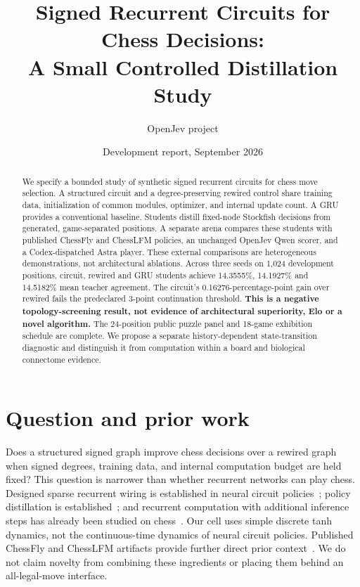 \documentclass[10pt]{article}
\title{Signed Recurrent Circuits for Chess Decisions:\\A Small Controlled Distillation Study}
\author{OpenJev project}
\date{Development report, September 2026}
\begin{document}
\maketitle

\begin{abstract}
We specify a bounded study of synthetic signed recurrent circuits for chess move
selection. A structured circuit and a degree-preserving rewired control share
training data, initialization of common modules, optimizer, and internal update
count. A GRU provides a conventional baseline. Students distill fixed-node
Stockfish decisions from generated, game-separated positions. A separate arena
compares these students with published ChessFly and ChessLFM policies, an
unchanged OpenJev Qwen scorer, and a Codex-dispatched Astra player. These external
comparisons are heterogeneous demonstrations, not architectural ablations.
Across three seeds on 1,024 development positions, circuit, rewired and GRU
students achieve 14.3555\%, 14.1927\% and 14.5182\% mean teacher agreement.
The circuit's 0.16276-percentage-point gain over rewired fails the predeclared
3-point continuation threshold. \textbf{This is a negative topology-screening
result, not evidence of architectural superiority, Elo or a novel algorithm.}
The 24-position public puzzle panel and 18-game exhibition schedule are complete.
We propose a separate history-dependent
state-transition diagnostic and distinguish it from computation within a board
and biological connectome evidence.
\end{abstract}

\section{Question and prior work}
Does a structured signed graph improve chess decisions over a rewired graph
when signed degrees, training data, and internal computation budget are held
fixed? This question is narrower than whether recurrent networks can play chess.
Designed sparse recurrent wiring is established in neural circuit
policies~\cite{lechner2020}; policy distillation is established~\cite{rusu2015};
and recurrent computation with additional inference steps has already been
studied on chess~\cite{schwarzschild2021}. Our cell uses simple discrete tanh
dynamics, not the continuous-time dynamics of neural circuit policies.
Published ChessFly and ChessLFM artifacts provide further direct
prior context~\cite{chessfly,chesslfm}. We do not claim novelty from combining
these ingredients or placing them behind an all-legal-move interface.
\end{document}
